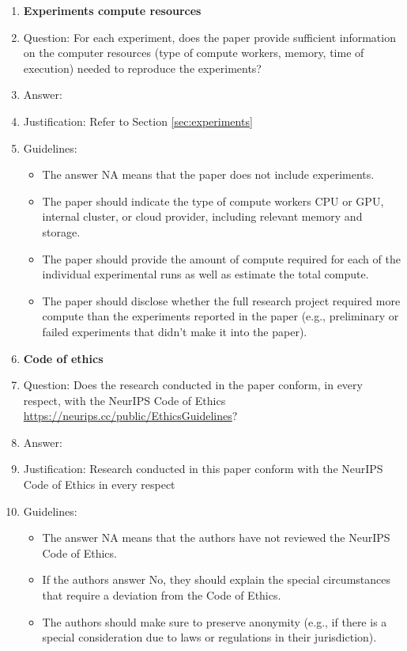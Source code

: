 \documentclass{article}
\begin{document}
\begin{enumerate}
\item {\bf Experiments compute resources}
    \item[] Question: For each experiment, does the paper provide sufficient information on the computer resources (type of compute workers, memory, time of execution) needed to reproduce the experiments?
    \item[] Answer: \answerYes{} %
    \item[] Justification: Refer to Section \ref{sec:experiments}
    \item[] Guidelines:
    \begin{itemize}
        \item The answer NA means that the paper does not include experiments.
        \item The paper should indicate the type of compute workers CPU or GPU, internal cluster, or cloud provider, including relevant memory and storage.
        \item The paper should provide the amount of compute required for each of the individual experimental runs as well as estimate the total compute. 
        \item The paper should disclose whether the full research project required more compute than the experiments reported in the paper (e.g., preliminary or failed experiments that didn't make it into the paper). 
    \end{itemize}
    
\item {\bf Code of ethics}
    \item[] Question: Does the research conducted in the paper conform, in every respect, with the NeurIPS Code of Ethics \url{https://neurips.cc/public/EthicsGuidelines}?
    \item[] Answer: \answerYes{} %
    \item[] Justification: Research conducted in this paper conform with the NeurIPS Code of Ethics in every respect
    \item[] Guidelines:
    \begin{itemize}
        \item The answer NA means that the authors have not reviewed the NeurIPS Code of Ethics.
        \item If the authors answer No, they should explain the special circumstances that require a deviation from the Code of Ethics.
        \item The authors should make sure to preserve anonymity (e.g., if there is a special consideration due to laws or regulations in their jurisdiction).
    \end{itemize}



\end{enumerate}
\end{document}
